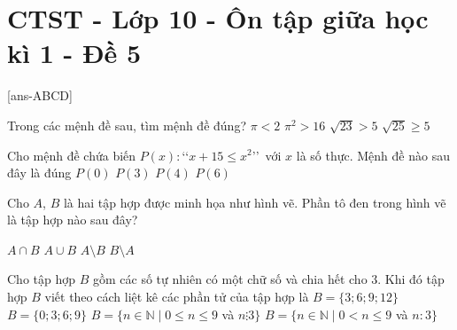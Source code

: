 \section{CTST - Lớp 10 - Ôn tập giữa học kì 1 - Đề 5}
\caulc
{}[ans-ABCD]
\begin{ex}%
	Trong các mệnh đề sau, tìm mệnh đề đúng?
	\choice
	{$\pi < 2$}
	{$\pi^2> 16$}
	{$\sqrt{23} > 5$}
	{\True $\sqrt{25} \geq 5$}
\end{ex}
\begin{ex}%
	Cho mệnh đề chứa biến $P(x)\colon$\lq\lq $x+15\leq x^2$\rq\rq\ với $x$ là số thực. Mệnh đề nào sau đây là đúng
	\choice
	{$P(0)$}
	{$P(3)$}
	{$P(4)$}
	{\True $P(6)$}
\end{ex}
\begin{ex}%
	Cho $A$, $B$ là hai tập hợp được minh họa như hình vẽ. Phần tô đen trong hình vẽ là tập hợp nào sau đây?
	\begin{center}
	\end{center}
	\choice
	{\True $A\cap B$}
	{$A\cup B$}
	{$A\setminus B$}
	{$B\setminus A$}
\end{ex}
\begin{ex}%
	Cho tập hợp $B$ gồm các số tự nhiên có một chữ số và chia hết cho $3$. Khi đó tập hợp $B$ viết theo cách liệt kê các phần tử của tập hợp là
	\choice
	{$B=\{3; 6; 9; 12\}$}
	{\True $B=\{0; 3; 6; 9\}$}
	{$B=\{n \in \mathbb{N}\mid 0\leq n \leq 9$ và $n \vdots 3\}$}
	{$B=\{n \in \mathbb{N}\mid 0< n \leq 9$ và $n: 3\}$}
\end{ex}
